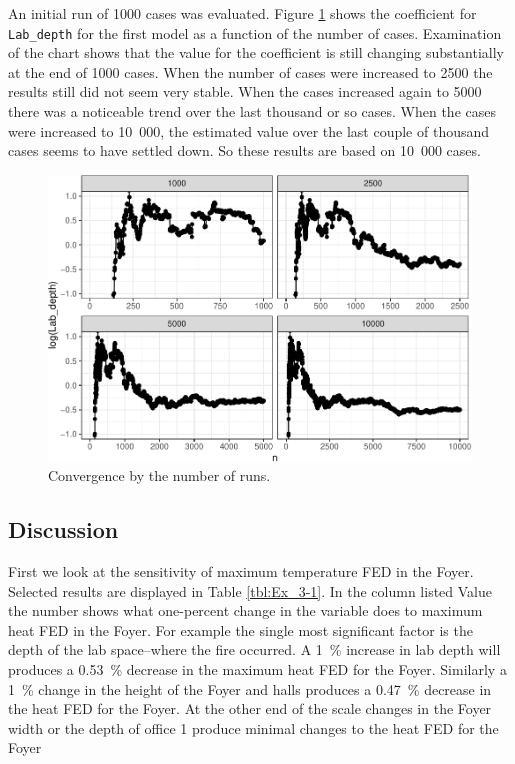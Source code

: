 \documentclass[12pt,twoside]{book}
\begin{document}
An initial run of 1000 cases was evaluated. Figure \ref{Ex_3-convergence_of_mean} shows the coefficient for \texttt{Lab\_depth} for the first model as a function of the number of cases. Examination of the chart shows that the value for the coefficient is still changing substantially at the end of 1000 cases. When the number of cases were increased to 2500 the results still did not seem very stable. When the cases increased again to 5000 there was a noticeable trend over the last thousand or so cases. When the cases were increased to 10~000, the estimated value over the last couple of thousand cases seems to have settled down. So these results are based on 10~000 cases.

\begin{figure}[h!]
\centering
\includegraphics[width=4.5in]{FIGURES/ex2_cvg_plot-1.pdf}
\caption{Convergence by the number of runs.}
\label{Ex_3-convergence_of_mean}
\end{figure}

\hypertarget{discussion}{%
\subsection{Discussion}\label{discussion}}

First we look at the sensitivity of maximum temperature FED in the Foyer. Selected results are displayed in Table  \ref{tbl:Ex_3-1}. In the column listed Value the number shows what one-percent change in the variable does to maximum heat FED in the Foyer. For example the single most significant factor is the depth of the lab space--where the fire occurred.  A 1~\% increase in lab depth will produces a 0.53~\% decrease in the maximum heat FED for the Foyer. Similarly a 1~\% change in the height of the Foyer and halls produces a 0.47~\% decrease in the heat FED for the Foyer. At the other end of the scale changes in the Foyer width or the depth of office 1 produce minimal changes to the heat FED for the Foyer
\end{document}

